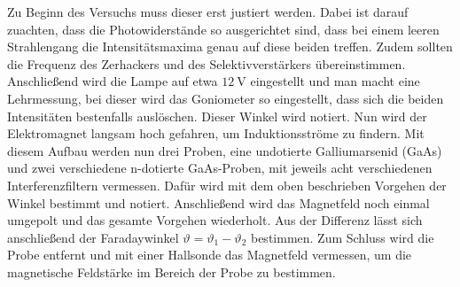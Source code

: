 Zu Beginn des Versuchs muss dieser erst justiert werden. Dabei ist darauf zuachten, dass die Photowiderstände so ausgerichtet sind,
dass bei einem leeren Strahlengang die Intensitätsmaxima genau auf diese beiden treffen. Zudem sollten die Frequenz des Zerhackers und des
Selektivverstärkers übereinstimmen.
Anschließend wird die Lampe auf etwa $\SI{12}{\volt}$ eingestellt und man macht eine Lehrmessung, bei dieser wird das Goniometer so eingestellt,
dass sich die beiden Intensitäten bestenfalls auslöschen. Dieser Winkel wird notiert. Nun wird der Elektromagnet langsam hoch gefahren, um
Induktionsströme zu findern.
Mit diesem Aufbau werden nun drei Proben, eine undotierte Galliumarsenid (GaAs) und zwei verschiedene n-dotierte GaAs-Proben, mit jeweils
acht verschiedenen Interferenzfiltern vermessen. Dafür wird mit dem oben beschrieben Vorgehen der Winkel bestimmt und notiert. Anschließend
wird das Magnetfeld noch einmal umgepolt und das gesamte Vorgehen wiederholt. Aus der Differenz lässt sich anschließend der Faradaywinkel
$\vartheta = \vartheta_1 - \vartheta_2$ bestimmen.
Zum Schluss wird die Probe entfernt und mit einer Hallsonde das Magnetfeld vermessen, um die magnetische Feldstärke im Bereich der Probe zu bestimmen.

